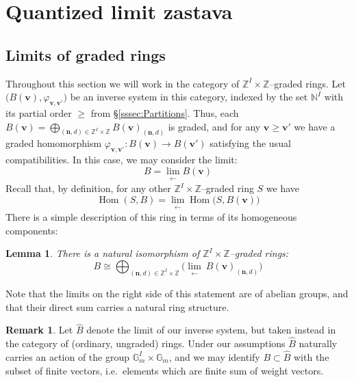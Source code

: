 \documentclass[11pt,reqno]{amsart}
\renewcommand{\mathbf}{\mathbold}
\numberwithin{equation}{section}
\newtheorem{Lemma}[equation]{Lemma}
\theoremstyle{definition}
\newtheorem{Remark}[equation]{Remark}
\newcommand{\bn}{\mathbf{n}}
\newcommand{\bv}{\mathbf{v}}
\newcommand{\GG}{\mathbb{G}}
\newcommand{\NN}{\mathbb{N}}
\newcommand{\ZZ}{\mathbb{Z}}
\renewcommand{\bv}{\mathbf{v}} %
\newcommand{\vertexset}{I}
\begin{document}
\section{Quantized limit zastava}
\label{sec:quantized_limit_zastava}


\subsection{Limits of graded rings}
Throughout this section we will work in the category of $\ZZ^\vertexset\times \ZZ$--graded rings. Let  $\big(B(\bv), \varphi_{\bv, \bv'}\big)$ be an inverse system in this category, indexed by the set $\NN^\vertexset$ with its partial order $\geq $ from \S \ref{sssec:Partitions}.  Thus, each $B(\bv) = \bigoplus_{(\bn, d) \in \ZZ^\vertexset\times \ZZ} B(\bv)_{(\bn, d)}$ is graded, and  for any $\bv \geq \bv'$ we have a graded homomorphism $\varphi_{\bv, \bv'} : B(\bv) \rightarrow B(\bv')$ satisfying the usual compatibilities.  In this case, we may consider the {limit}:
\begin{equation}
    B = \lim_{\substack{\longleftarrow}} B(\bv)    
\end{equation}
Recall that, by definition, for any other $\ZZ^\vertexset\times \ZZ$--graded ring $S$ we have
$$
    \operatorname{Hom}( S, B) = \lim_{\substack{\longleftarrow}} \operatorname{Hom}\big(S, B(\bv) \big)
$$
There is a simple description of this ring in terms of its homogeneous components:

\begin{Lemma}
    \label{lem:componentsoflimit}
    There is a natural isomorphism of $\ZZ^\vertexset \times \ZZ$--graded rings:
    $$B \cong \bigoplus_{(\bn, d) \in \ZZ^\vertexset \times \ZZ} \Big( \displaystyle{\lim_{\substack{\longleftarrow}}}~B(\bv)_{(\bn, d)} \Big)$$
\end{Lemma}
Note that the limits on the right side of this statement are of abelian groups, and that their direct sum carries a natural ring structure.

\begin{Remark}
    Let $\widehat{B}$ denote the limit of our inverse system, but taken instead in the  category of (ordinary, ungraded) rings. Under our assumptions $\widehat{B}$ naturally carries an action of the group $\GG_m^\vertexset\times \GG_m$, and we may identify $B \subset \widehat{B}$ with the subset of finite vectors, i.e.~elements which are finite sum of weight vectors.
\end{Remark}
\end{document}
